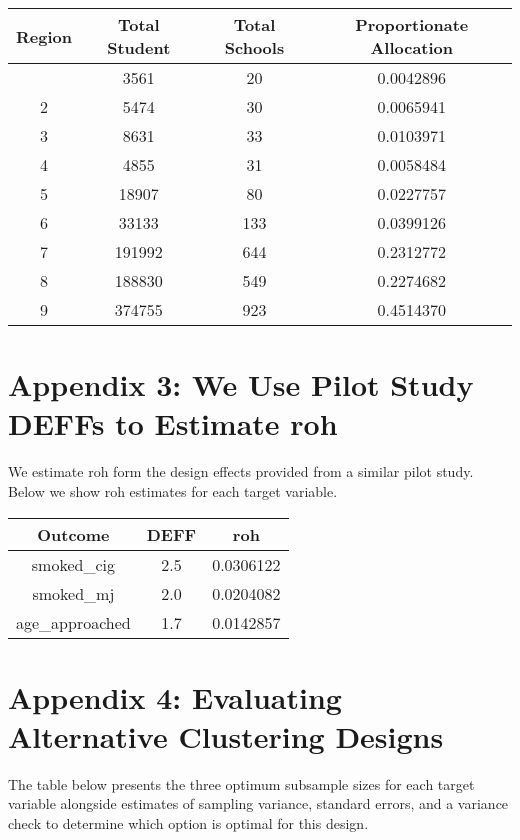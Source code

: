\documentclass[
  12pt]{article}
\begin{document}
\begin{longtable}[]{@{}cccc@{}}
\toprule\noalign{}
Region & Total Student & Total Schools & Proportionate Allocation \\
\midrule\noalign{}
\endhead
\bottomrule\noalign{}
\endlastfoot
1 & 3561 & 20 & 0.0042896 \\
2 & 5474 & 30 & 0.0065941 \\
3 & 8631 & 33 & 0.0103971 \\
4 & 4855 & 31 & 0.0058484 \\
5 & 18907 & 80 & 0.0227757 \\
6 & 33133 & 133 & 0.0399126 \\
7 & 191992 & 644 & 0.2312772 \\
8 & 188830 & 549 & 0.2274682 \\
9 & 374755 & 923 & 0.4514370 \\
\end{longtable}

\newpage

\section{Appendix 3: We Use Pilot Study DEFFs to Estimate
roh}\label{appendix-3-we-use-pilot-study-deffs-to-estimate-roh}

We estimate roh form the design effects provided from a similar pilot
study. Below we show roh estimates for each target variable.

\begin{longtable}[]{@{}ccc@{}}
\toprule\noalign{}
Outcome & DEFF & roh \\
\midrule\noalign{}
\endhead
\bottomrule\noalign{}
\endlastfoot
smoked\_cig & 2.5 & 0.0306122 \\
smoked\_mj & 2.0 & 0.0204082 \\
age\_approached & 1.7 & 0.0142857 \\
\end{longtable}

\newpage

\section{Appendix 4: Evaluating Alternative Clustering
Designs}\label{appendix-4-evaluating-alternative-clustering-designs}

The table below presents the three optimum subsample sizes for each
target variable alongside estimates of sampling variance, standard
errors, and a variance check to determine which option is optimal for
this design.
\end{document}
